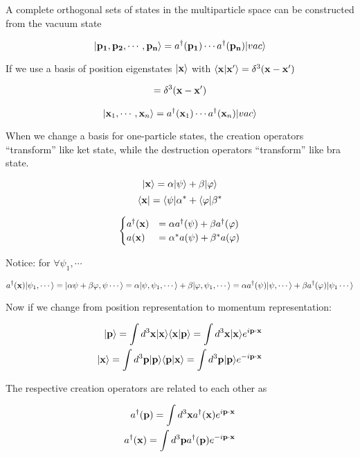 A complete orthogonal sets of states in the multiparticle space can be constructed from the vacuum state 

\[|{\bf p_1},{\bf p_2},\cdots,{\bf p_n}\rangle = a^\dagger({\bf p_1})\cdots a^\dagger({\bf p_n})|vac\rangle \]

If we use a basis of position eigenstates $|\bf{x}\rangle$ with $\langle {\bf x}|{\bf x'}\rangle = \delta^3({\bf x} - {\bf x'})$

\begin{align}
[a({\bf x}),a^\dagger({\bf x'})] = \delta^3({\bf x} - {\bf x'})
\end{align}

\[|{\bf x}_1,\cdots,{\bf x}_n\rangle = a^\dagger({\bf x}_1)\cdots a^\dagger({\bf x}_n)|vac\rangle \]

When we change a basis for one-particle states, the creation operators ``transform'' like ket state, while the destruction operators ``transform'' like bra state. 

\[|{\bf x}\rangle = \alpha|\psi\rangle + \beta|\varphi\rangle \]
\[\langle{\bf x}| = \langle\psi|\alpha^* + \langle\varphi|\beta^* \]

\[\begin{cases}
a^\dagger({\bf x}) &= \alpha a^\dagger(\psi)+\beta a^\dagger(\varphi)\\
a({\bf x}) &= \alpha^* a(\psi) + \beta^* a(\varphi)
\end{cases}\]

Notice: for $\forall \psi_1,\cdots$

\[a^\dagger({\bf x})|\psi_1,\cdots\rangle = |\alpha\psi+\beta\varphi,\psi\cdots\rangle = \alpha|\psi,\psi_1,\cdots\rangle + \beta|\varphi,\psi_1,\cdots\rangle = \alpha a^\dagger(\psi)|\psi,\cdots\rangle + \beta a^\dagger(\varphi)|\psi_1\cdots\rangle \]

Now if we change from position representation to momentum representation:

\[\begin{split}
|{\bf p}\rangle = \int d^3{\bf x} |{\bf x}\rangle\langle{\bf x}|{\bf p}\rangle = \int d^3{\bf x}|{\bf x}\rangle e^{i{\bf p}\cdot{\bf x}}\\
|{\bf x}\rangle = \int d^3{\bf p} |{\bf p}\rangle\langle{\bf p}|{\bf x}\rangle = \int d^3{\bf p}|{\bf p}\rangle e^{-i{\bf p}\cdot{\bf x}}
\end{split}\]

The respective creation operators are related to each other as 

\begin{align}
\begin{split}
a^\dagger({\bf p}) = \int d^3{\bf x} a^\dagger({\bf x}) e^{i{\bf p}\cdot{\bf x}}\\
a^\dagger({\bf x}) = \int d^3{\bf p} a^\dagger({\bf p}) e^{-i{\bf p}\cdot{\bf x}}
\end{split}
\end{align}

